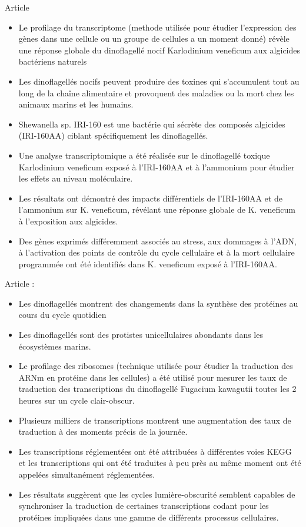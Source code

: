 \documentclass{article}
\begin{document}
Article \cite{wang2023transcriptome}
\begin{itemize}
\item Le profilage du transcriptome (methode utilisée pour étudier l'expression des gènes dans une cellule ou un groupe de cellules a un moment donné) révèle une réponse globale du dinoflagellé nocif Karlodinium veneficum aux algicides bactériens naturels
\item Les dinoflagellés nocifs peuvent produire des toxines qui s'accumulent tout au long de la chaîne alimentaire et provoquent des maladies ou la mort chez les animaux marins et les humains.
\item Shewanella sp. IRI-160 est une bactérie qui sécrète des composés algicides (IRI-160AA) ciblant spécifiquement les dinoflagellés.
\item Une analyse transcriptomique a été réalisée sur le dinoflagellé toxique Karlodinium veneficum exposé à l'IRI-160AA et à l'ammonium pour étudier les effets au niveau moléculaire.
\item Les résultats ont démontré des impacts différentiels de l'IRI-160AA et de l'ammonium sur K. veneficum, révélant une réponse globale de K. veneficum à l'exposition aux algicides.
\item Des gènes exprimés différemment associés au stress, aux dommages à l'ADN, à l'activation des points de contrôle du cycle cellulaire et à la mort cellulaire programmée ont été identifiés dans K. veneficum exposé à l'IRI-160AA.
\end{itemize}

Article \cite{bowazolo2023ribosome} : 
\begin{itemize}
    \item Les dinoflagellés montrent des changements dans la synthèse des protéines au cours du cycle quotidien
    \item  Les dinoflagellés sont des protistes unicellulaires abondants dans les écosystèmes marins.
    \item  Le profilage des ribosomes (technique utilisée pour étudier la traduction des ARNm en protéine dans les cellules)  a été utilisé pour mesurer les taux de traduction des transcriptions du dinoflagellé Fugacium kawagutii toutes les 2 heures sur un cycle clair-obscur.
    \item Plusieurs milliers de transcriptions montrent une augmentation des taux de traduction à des moments précis de la journée.
    \item  Les transcriptions réglementées ont été attribuées à différentes voies KEGG et les transcriptions qui ont été traduites à peu près au même moment ont été appelées simultanément réglementées.
    \item  Les résultats suggèrent que les cycles lumière-obscurité semblent capables de synchroniser la traduction de certaines transcriptions codant pour les protéines impliquées dans une gamme de différents processus cellulaires.
\end{itemize}
\end{document}
